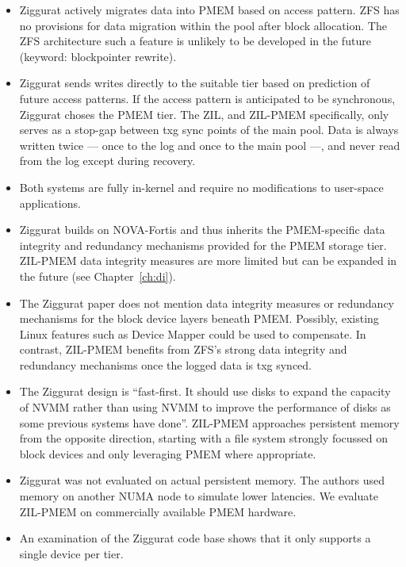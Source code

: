 \documentclass[12pt,a4paper,twoside,draft]{book}
\begin{document}
\begin{itemize}
    \item Ziggurat actively migrates data into PMEM based on access pattern.
          ZFS has no provisions for data migration within the pool after block allocation.
          The ZFS architecture such a feature is unlikely to be developed in the future (keyword: blockpointer rewrite).
    \item Ziggurat sends writes directly to the suitable tier based on prediction of future access patterns.
    If the access pattern is anticipated to be synchronous, Ziggurat choses the PMEM tier.
    The ZIL, and ZIL-PMEM specifically, only serves as a stop-gap between txg sync points of the main pool.
    Data is always written twice --- once to the log and once to the main pool ---, and never read from the log except during recovery.
    \item Both systems are fully in-kernel and  require no modifications to user-space applications.
    \item Ziggurat builds on NOVA-Fortis and thus inherits the PMEM-specific data integrity and redundancy mechanisms provided for the PMEM storage tier.
        ZIL-PMEM data integrity measures are more limited but can be expanded in the future (see Chapter~\ref{ch:di}).
    \item The Ziggurat paper does not mention data integrity measures or redundancy mechanisms for the block device layers beneath PMEM.
        Possibly, existing Linux features such as Device Mapper could be used to compensate.
        In contrast, ZIL-PMEM benefits from ZFS’s strong data integrity and redundancy mechanisms once the logged data is txg synced.
    \item The Ziggurat design is “fast-first. It should use disks to expand the capacity of NVMM rather than using NVMM to improve the performance of disks as some previous systems have done”.
        ZIL-PMEM approaches persistent memory from the opposite direction, starting with a file system strongly focussed on block devices and only leveraging PMEM where appropriate.
    \item Ziggurat was not evaluated on actual persistent memory. The authors used memory on another NUMA node to simulate lower latencies.
        We evaluate ZIL-PMEM on commercially available PMEM hardware.
    \item An examination of the Ziggurat code base shows that it only supports a single device per tier.
\end{itemize}
\end{document}
